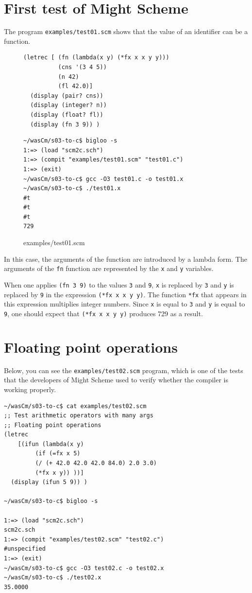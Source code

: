 \documentclass[a4paper,12pt]{book}
\newenvironment{fmpage}[1]
           {\begin{lrbox}{\fmbox}\begin{minipage}{#1}}
           {\end{minipage}\end{lrbox}\fbox{\usebox{\fmbox}}}
\begin{document}
\section{First test of Might Scheme}

The program \verb|examples/test01.scm| shows
that the value of an identifier can be a
function.
\begin{figure}[!h]
\begin{fmpage}{0.8\linewidth}
\begin{verbatim}
(letrec [ (fn (lambda(x y) (*fx x x y y)))
          (cns '(3 4 5))
          (n 42)
          (fl 42.0)]
  (display (pair? cns))
  (display (integer? n))
  (display (float? fl))
  (display (fn 3 9)) )
\end{verbatim}
\end{fmpage}
\begin{fmpage}{0.8\linewidth}
\begin{verbatim}
~/wasCm/s03-to-c$ bigloo -s
1:=> (load "scm2c.sch")
1:=> (compit "examples/test01.scm" "test01.c")
1:=> (exit)
~/wasCm/s03-to-c$ gcc -O3 test01.c -o test01.x
~/wasCm/s03-to-c$ ./test01.x 
#t
#t
#t
729
\end{verbatim}
\end{fmpage}
\caption{examples/test01.scm}
\label{examples/test01.scm}
\end{figure}

In this case, the arguments of
the function are introduced by a lambda
form. The arguments of the \verb|fn|
function are represented by the \verb|x|
and \verb|y| variables.

When one applies \verb|(fn 3 9)| to the values
\verb|3| and \verb|9|, \verb|x| is replaced
by \verb|3| and \verb|y| is replaced by
\verb|9| in the expression \verb|(*fx x x y y)|.
The function \verb|*fx| that appears in this
expression multiplies integer numbers.
Since \verb|x| is equal to \verb|3| and \verb|y|
is equal to \verb|9|, one should expect that
\verb|(*fx x x y y)| produces 729 as a result.

\section{Floating point operations}
Below, you can see the \verb|examples/test02.scm|
program, which is one of the tests that the
developers of Might Scheme used to verify whether
the compiler is working properly.

\begin{verbatim}
~/wasCm/s03-to-c$ cat examples/test02.scm 
;; Test arithmetic operators with many args
;; Floating point operations
(letrec 
    [(ifun (lambda(x y)
	     (if (=fx x 5)
		 (/ (+ 42.0 42.0 42.0 84.0) 2.0 3.0)
		 (*fx x y)) ))]
  (display (ifun 5 9)) )

~/wasCm/s03-to-c$ bigloo -s

1:=> (load "scm2c.sch")
scm2c.sch
1:=> (compit "examples/test02.scm" "test02.c")
#unspecified
1:=> (exit)
~/wasCm/s03-to-c$ gcc -O3 test02.c -o test02.x
~/wasCm/s03-to-c$ ./test02.x 
35.0000
\end{verbatim}
\end{document}
